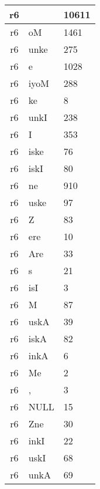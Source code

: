 \documentclass[a4 paper]{article}
\begin{document}
\begin{longtable}{cp{}p{}}
r6 &  & 10611\\ \midrule r6 & oM & 1461\\ \midrule r6 & unke & 275\\ \midrule r6 & e & 1028\\ \midrule r6 & iyoM & 288\\ \midrule r6 & ke & 8\\ \midrule r6 & unkI & 238\\ \midrule r6 & I & 353\\ \midrule r6 & iske & 76\\ \midrule r6 & iskI & 80\\ \midrule r6 & ne & 910\\ \midrule r6 & uske & 97\\ \midrule r6 & Z & 83\\ \midrule r6 & ere & 10\\ \midrule r6 & Are & 33\\ \midrule r6 & s & 21\\ \midrule r6 & isI & 3\\ \midrule r6 & M & 87\\ \midrule r6 & uskA & 39\\ \midrule r6 & iskA & 82\\ \midrule r6 & inkA & 6\\ \midrule r6 & Me & 2\\ \midrule r6 & , & 3\\ \midrule r6 & NULL & 15\\ \midrule r6 & Zne & 30\\ \midrule r6 & inkI & 22\\ \midrule r6 & uskI & 68\\ \midrule r6 & unkA & 69\\ \midrule 
\end{longtable}
\end{document}
